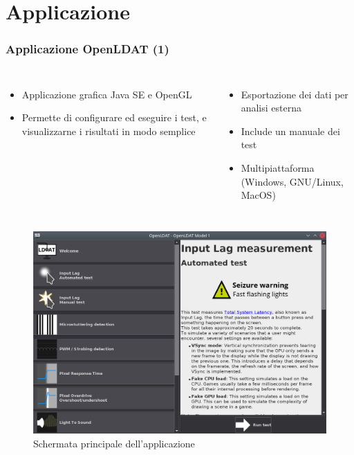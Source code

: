 \documentclass[xcolor={x11names}]{beamer}
\begin{document}
\section{Applicazione}
\begin{frame}[shrink=15]
	\frametitle{Applicazione OpenLDAT (1)}
	\begin{columns}
		\begin{itemize}
			\item \alert{Applicazione grafica} Java SE e OpenGL
			\item Permette di \alert{configurare ed eseguire i test, e visualizzarne i risultati} in modo semplice
		\end{itemize}
		\begin{itemize}
			\item \alert{Esportazione dei dati} per analisi esterna
			\item \alert{Include un manuale} dei test
			\item \alert{Multipiattaforma} (Windows, GNU/Linux, MacOS)
		\end{itemize}
	\end{columns}
	\begin{figure}
		\includegraphics[height=0.7\textheight]{Applicazione_files/gui_mainMenu2.png}
		\caption*{Schermata principale dell'applicazione}
	\end{figure}
\end{frame}
\end{document}

